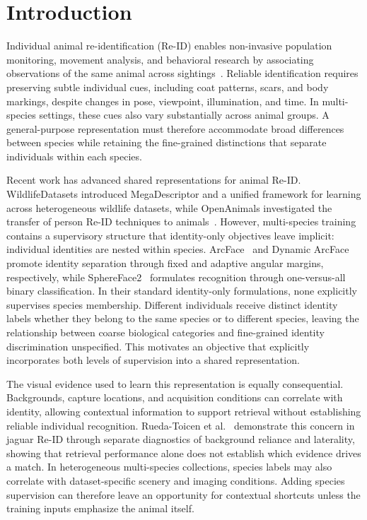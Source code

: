 \section{Introduction}
\label{sec:intro}

Individual animal re-identification (Re-ID) enables non-invasive population monitoring, movement analysis, and behavioral research by associating observations of the same animal across sightings~\cite{tuia2022perspectives,vcermak2024wildlifedatasets}. Reliable identification requires preserving subtle individual cues, including coat patterns, scars, and body markings, despite changes in pose, viewpoint, illumination, and time. In multi-species settings, these cues also vary substantially across animal groups. A general-purpose representation must therefore accommodate broad differences between species while retaining the fine-grained distinctions that separate individuals within each species.

Recent work has advanced shared representations for animal Re-ID. WildlifeDatasets introduced MegaDescriptor and a unified framework for learning across heterogeneous wildlife datasets, while OpenAnimals investigated the transfer of person Re-ID techniques to animals~\cite{vcermak2024wildlifedatasets,hou2025openanimals}. However, multi-species training contains a supervisory structure that identity-only objectives leave implicit: individual identities are nested within species. ArcFace~\cite{deng2019arcface} and Dynamic ArcFace~\cite{jiao2021dynarcface} promote identity separation through fixed and adaptive angular margins, respectively, while SphereFace2~\cite{wen2022sphereface2} formulates recognition through one-versus-all binary classification. In their standard identity-only formulations, none explicitly supervises species membership. Different individuals receive distinct identity labels whether they belong to the same species or to different species, leaving the relationship between coarse biological categories and fine-grained identity discrimination unspecified. This motivates an objective that explicitly incorporates both levels of supervision into a shared representation.

The visual evidence used to learn this representation is equally consequential. Backgrounds, capture locations, and acquisition conditions can correlate with identity, allowing contextual information to support retrieval without establishing reliable individual recognition. Rueda-Toicen et al.~\cite{ruedatoicen2026jaguar} demonstrate this concern in jaguar Re-ID through separate diagnostics of background reliance and laterality, showing that retrieval performance alone does not establish which evidence drives a match. In heterogeneous multi-species collections, species labels may also correlate with dataset-specific scenery and imaging conditions. Adding species supervision can therefore leave an opportunity for contextual shortcuts unless the training inputs emphasize the animal itself.

